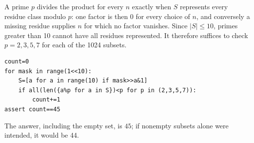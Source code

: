 A prime $p$ divides the product for every $n$ exactly when $S$ represents every residue class modulo $p$: one factor is then 0 for every choice of $n$, and conversely a missing residue supplies $n$ for which no factor vanishes. Since $|S|\le10$, primes greater than 10 cannot have all residues represented. It therefore suffices to check $p=2,3,5,7$ for each of the 1024 subsets.
\begin{verbatim}
count=0
for mask in range(1<<10):
    S=[a for a in range(10) if mask>>a&1]
    if all(len({a%p for a in S})<p for p in (2,3,5,7)):
        count+=1
assert count==45
\end{verbatim}
The answer, including the empty set, is $\boxed{45}$; if nonempty subsets alone were intended, it would be 44.
